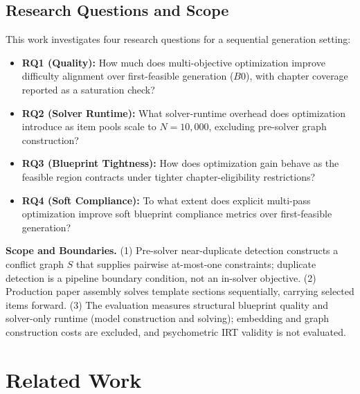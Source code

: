 \documentclass[runningheads]{llncs}
\begin{document}
\subsection{Research Questions and Scope}
This work investigates four research questions for a sequential generation setting:
\begin{itemize}
    \item \textbf{RQ1 (Quality):} How much does multi-objective optimization improve difficulty alignment over first-feasible generation ($B0$), with chapter coverage reported as a saturation check?
    \item \textbf{RQ2 (Solver Runtime):} What solver-runtime overhead does optimization introduce as item pools scale to $N=10{,}000$, excluding pre-solver graph construction?
    \item \textbf{RQ3 (Blueprint Tightness):} How does optimization gain behave as the feasible region contracts under tighter chapter-eligibility restrictions?
    \item \textbf{RQ4 (Soft Compliance):} To what extent does explicit multi-pass optimization improve soft blueprint compliance metrics over first-feasible generation?
\end{itemize}

\noindent\textbf{Scope and Boundaries.} (1) Pre-solver near-duplicate detection constructs a conflict graph $S$ that supplies pairwise at-most-one constraints; duplicate detection is a pipeline boundary condition, not an in-solver objective. (2) Production paper assembly solves template sections sequentially, carrying selected items forward. (3) The evaluation measures structural blueprint quality and solver-only runtime (model construction and solving); embedding and graph construction costs are excluded, and psychometric IRT validity is not evaluated.

\section{Related Work}
\label{sec:related}
\end{document}
